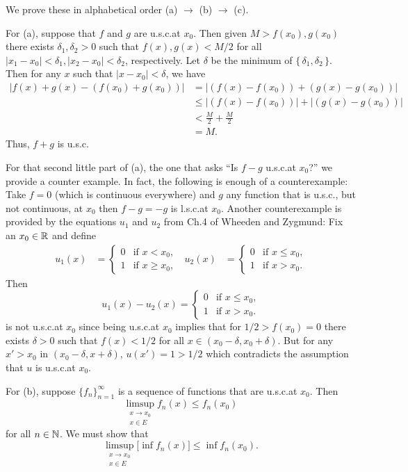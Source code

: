 \begin{solution}
  We prove these in alphabetical order (a) \(\to\) (b) \(\to\) (c).

  For (a), suppose that \(f\) and \(g\) are u.s.c.\@ at \(x_0\). Then given
  \(M>f(x_0),g(x_0)\) there exists \(\delta_1,\delta_2>0\) such that
  \(f(x),g(x)<M/2\) for all \(|x_1-x_0|<\delta_1,|x_2-x_0|<\delta_2\),
  respectively. Let \(\delta\) be the minimum of
  \(\{\,\delta_1,\delta_2\,\}\). Then for any \(x\) such that
  \(|x-x_0|<\delta\), we have
  \begin{align*}
    |f(x)+g(x)-(f(x_0)+g(x_0))|
    &=|(f(x)-f(x_0))+(g(x)-g(x_0))|\\
    &\leq |(f(x)-f(x_0))|+|(g(x)-g(x_0))|\\
    &<\frac{M}{2}+\frac{M}{2}\\
    &=M.
  \end{align*}
  Thus, \(f+g\) is u.s.c.

  For that second little part of (a), the one that asks ``Is \(f-g\)
  u.s.c.\@ at \(x_0\)?'' we provide a counter example. In fact, the
  following is enough of a counterexample: Take \(f=0\) (which is
  continuous everywhere) and \(g\) any function that is u.s.c.\@, but not
  continuous, at \(x_0\) then \(f-g=-g\) is l.s.c.\@ at \(x_0\). Another
  counterexample is provided by the equations \(u_1\) and \(u_2\) from
  Ch.\@ 4 of Wheeden and Zygmund: Fix an \(x_0\in\mathbb{R}\) and define
  \begin{align*}
    u_1(x)&=\begin{cases}
      0&\text{if \(x<x_0\),}\\
      1&\text{if \(x\geq x_0\),}
    \end{cases}
       &
         u_2(x)&=\begin{cases}
           0&\text{if \(x\leq x_0\),}\\
           1&\text{if \(x>x_0\).}
    \end{cases}
  \end{align*}
  Then
  \[
    u_1(x)-u_2(x)=
    \begin{cases}
      0&\text{if \(x\leq x_0\),}\\
      1&\text{if \(x>x_0\).}
    \end{cases}
  \]
  is not u.s.c.\@ at \(x_0\) since being u.s.c.\@ at \(x_0\) implies that
  for \(1/2>f(x_0)=0\) there exists \(\delta>0\) such that \(f(x)<1/2\) for
  all \(x\in (x_0-\delta,x_0+\delta)\). But for any \(x'>x_0\) in
  \((x_0-\delta,x+\delta)\), \(u(x')=1>1/2\) which contradicts the
  assumption that \(u\) is u.s.c.\@ at \(x_0\).

  For (b), suppose \(\{f_n\}_{n=1}^\infty\) is a sequence of functions that
  are u.s.c.\@ at \(x_0\). Then
  \[
    \limsup_{\substack{x\to x_0\\ x\in E}}f_n(x)\leq f_n(x_0)
  \]
  for all \(n\in\mathbb{N}\). We must show that
  \[
    \limsup_{\substack{x\to x_0\\ x\in E}}\bigl[\inf f_n(x)\bigr]\leq \inf
    f_n(x_0).
  \]
\end{solution}

